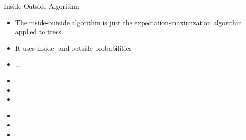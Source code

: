 \documentclass[xcolor=pdftex,x11names,table,hyperref]{beamer}
\begin{document}
\begin{frame}{Inside-Outside Algorithm}
\begin{itemize}
	\item The inside-outside algorithm is just the expectation-maximization algorithm applied to trees
	\item It uses inside- and outside-probabilities
	\item ...
\end{itemize}
\end{frame}




\begin{frame}{}
\begin{itemize}
	\item 
	\item 
	\item 
\end{itemize}
\end{frame}



\begin{frame}{}
\begin{itemize}
	\item 
	\item 
	\item 
\end{itemize}
\end{frame}




\end{document}
